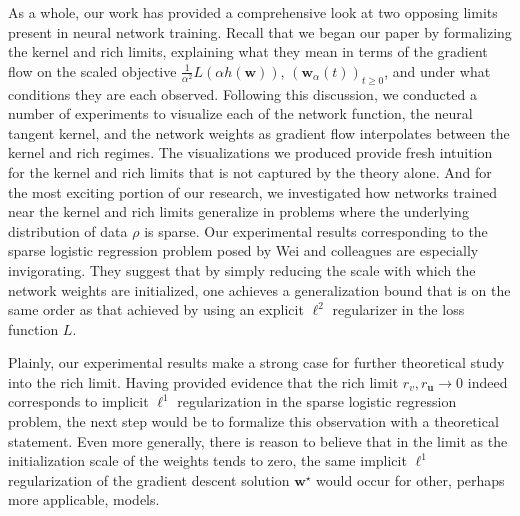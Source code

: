 \documentclass{article}
\begin{document}
As a whole, our work has provided a comprehensive look at two opposing limits present in neural network training. Recall that we began our paper by formalizing the kernel and rich limits, explaining what they mean in terms of the gradient flow on the scaled objective $\frac{1}{\alpha^2}L(\alpha h(\boldsymbol{w}))$, $(\boldsymbol{w}_{\alpha}(t))_{t \geq 0}$, and under what conditions they are each observed. Following this discussion, we conducted a number of experiments to visualize each of the network function, the neural tangent kernel, and the network weights as gradient flow interpolates between the kernel and rich regimes. The visualizations we produced provide fresh intuition for the kernel and rich limits that is not captured by the theory alone. And for the most exciting portion of our research, we investigated how networks trained near the kernel and rich limits generalize in problems where the underlying distribution of data $\rho$ is sparse. Our experimental results corresponding to the sparse logistic regression problem posed by Wei and colleagues are especially invigorating. They suggest that by simply reducing the scale with which the network weights are initialized, one achieves a generalization bound that is on the same order as that achieved by using an explicit $\ell^2$ regularizer in the loss function $L$.

Plainly, our experimental results make a strong case for further theoretical study into the rich limit. Having provided evidence that the rich limit $r_{v}, r_{\boldsymbol{u}} \rightarrow 0$ indeed corresponds to implicit $\ell^1$ regularization in the sparse logistic regression problem, the next step would be to formalize this observation with a theoretical statement. Even more generally, there is reason to believe that in the limit as the initialization scale of the weights tends to zero, the same implicit $\ell^1$ regularization of the gradient descent solution $\boldsymbol{w}^{\star}$ would occur for other, perhaps more applicable, models. 

\pagebreak



\end{document}
